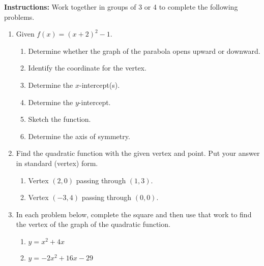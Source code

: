 



\noindent \textbf{Instructions:}  Work together in groups of  3 or 4 to complete the following problems.




\begin{enumerate}
\item Given $f(x)=(x+2)^2-1$.
\begin{enumerate}
\item Determine whether the graph of the parabola opens upward or
  downward.
  \vfill
\item Identify the coordinate for the vertex. \\ [1cm]
\item Determine the $x$-intercept(s).
  \vfill
\item Determine the $y$-intercept.
  \vfill
\item Sketch the function.\\

\item Determine the axis of symmetry.

\end{enumerate}


\clearpage

\item Find the quadratic function with the given vertex and point.
  Put your answer in standard (vertex) form.
\begin{enumerate}
\item  Vertex $(2,0)$ passing through $(1,3)$.
  \vfill
 
\item  Vertex $(-3,4)$ passing through $(0,0)$.
   \vfill
 \end{enumerate}


\item In each problem below, complete the square and then use that
  work to find the vertex of the graph of the quadratic function.
\begin{enumerate}
\item $y=x^2+4x$
  \vfill
\item  $y=-2x^2+16x-29$
  \vfill
\end{enumerate}



\end{enumerate}
